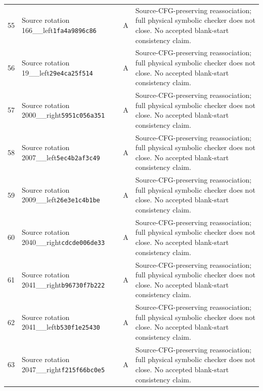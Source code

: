 \begin{longtable}{@{}rp{}cp{}@{}}
55 & Source rotation 166\_\allowbreak 179\_\allowbreak left\newline\texttt{1fa4a9896c86} & A & Source-CFG-preserving reassociation; full physical symbolic checker does not close. No accepted blank-start consistency claim.\\[5pt]
56 & Source rotation 19\_\allowbreak 29\_\allowbreak left\newline\texttt{29e4ca25f514} & A & Source-CFG-preserving reassociation; full physical symbolic checker does not close. No accepted blank-start consistency claim.\\[5pt]
57 & Source rotation 2000\_\allowbreak 2001\_\allowbreak right\newline\texttt{5951c056a351} & A & Source-CFG-preserving reassociation; full physical symbolic checker does not close. No accepted blank-start consistency claim.\\[5pt]
58 & Source rotation 2007\_\allowbreak 2008\_\allowbreak left\newline\texttt{5ec4b2af3c49} & A & Source-CFG-preserving reassociation; full physical symbolic checker does not close. No accepted blank-start consistency claim.\\[5pt]
59 & Source rotation 2009\_\allowbreak 2011\_\allowbreak left\newline\texttt{26e3e1c4b1be} & A & Source-CFG-preserving reassociation; full physical symbolic checker does not close. No accepted blank-start consistency claim.\\[5pt]
60 & Source rotation 2040\_\allowbreak 2041\_\allowbreak right\newline\texttt{cdcde006de33} & A & Source-CFG-preserving reassociation; full physical symbolic checker does not close. No accepted blank-start consistency claim.\\[5pt]
61 & Source rotation 2041\_\allowbreak 2042\_\allowbreak right\newline\texttt{b96730f7b222} & A & Source-CFG-preserving reassociation; full physical symbolic checker does not close. No accepted blank-start consistency claim.\\[5pt]
62 & Source rotation 2041\_\allowbreak 2047\_\allowbreak left\newline\texttt{b530f1e25430} & A & Source-CFG-preserving reassociation; full physical symbolic checker does not close. No accepted blank-start consistency claim.\\[5pt]
63 & Source rotation 2047\_\allowbreak 2048\_\allowbreak right\newline\texttt{f215f66bc0e5} & A & Source-CFG-preserving reassociation; full physical symbolic checker does not close. No accepted blank-start consistency claim.\\[5pt]

\end{longtable}
